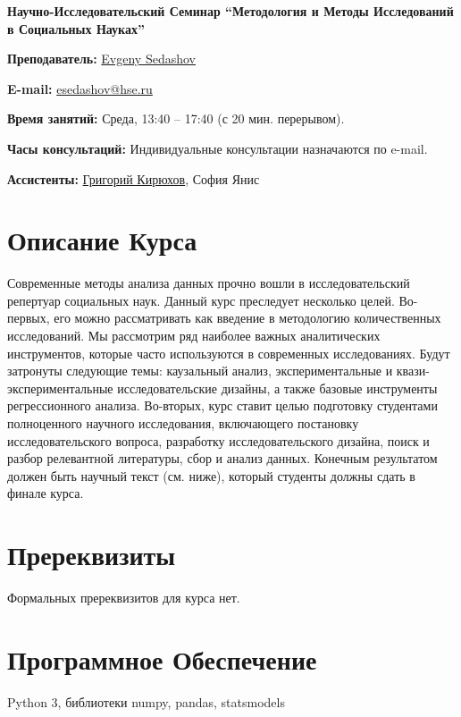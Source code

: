 \documentclass[12pt]{article}
\begin{document}
\begin{center}
\huge \textbf{Научно-Исследовательский Семинар  ``Методология и Методы Исследований в Социальных Науках''}
\end{center}
\vspace{5 mm}

\textbf{Преподаватель:} \href{https://www.hse.ru/staff/sedashov}{Evgeny Sedashov} 
\vspace{2 mm}

\textbf{E-mail:} \href{mailto:esedashov@hse.ru}{esedashov@hse.ru}
\vspace{2 mm}

\textbf{Время занятий:} Среда, 13:40 -- 17:40 (с 20 мин. перерывом). 
\vspace{2 mm}

\textbf{Часы консультаций:} Индивидуальные консультации назначаются по e-mail. 
\vspace{2 mm}

\textbf{Ассистенты:} \href{https://www.hse.ru/staff/KirilHSE/}{Григорий Кирюхов}, София Янис
\vspace{2 mm}


\section*{Описание Курса} 
Современные методы анализа данных прочно вошли в исследовательский репертуар социальных наук. Данный курс преследует несколько целей. Во-первых, его можно рассматривать как введение в методологию количественных исследований. Мы рассмотрим ряд наиболее важных аналитических инструментов, которые часто используются в современных исследованиях. Будут затронуты следующие темы: каузальный анализ, экспериментальные и квази-экспериментальные исследовательские дизайны, а также базовые инструменты регрессионного анализа. Во-вторых, курс ставит целью подготовку студентами полноценного научного исследования, включающего постановку исследовательского вопроса, разработку исследовательского дизайна, поиск и разбор релевантной литературы, сбор и анализ данных. Конечным результатом должен быть научный текст (см. ниже), который студенты должны сдать в финале курса.  
\section*{Пререквизиты} 
Формальных пререквизитов для курса нет. 
\section*{Программное Обеспечение} 
Python 3,  библиотеки numpy,  pandas,  statsmodels 
\end{document}
